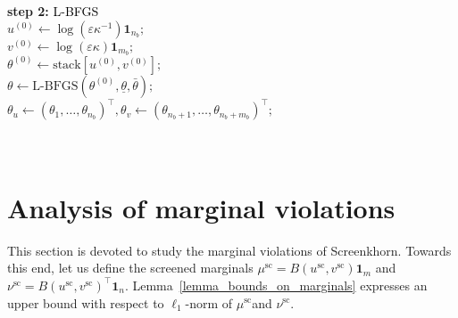 \documentclass{article}
\begin{document}
\begin{algorithm}[htbp]
\textbf{step 2:} \textcolor{black}{L-BFGS}\\

\nl  $u^{(0)} \gets \log(\varepsilon\kappa^{-1}) \mathbf 1_{n_b} ;$\\
\nl  $v^{(0)} \gets \log(\varepsilon\kappa) \mathbf 1_{m_b} ;$\\
\nl  $\theta^{(0)} \gets \text{stack}[u^{(0)}, v^{(0)}];$\\
\nl   $\theta \gets \text{L-BFGS}(\theta^{(0)}, \underline{\theta}, \bar{\theta});$\\
\nl   $\theta_u \gets (\theta_1, \ldots, \theta_{n_b})^\top, \theta_v \gets(\theta_{n_b+1}, \ldots, \theta_{n_b+m_b})^\top;$\\


\\
\\
\nl   {}
\end{algorithm}


\section{Analysis of marginal violations}
\label{sec:error_analysis}

This section is devoted to study the marginal violations of Screenkhorn. Towards this end, let us define the screened marginals $\mu^{\text{sc}} = B(u^{\text{sc}}, v^{\text{sc}}) \mathbf 1_m$ and $\nu^{\text{sc}} = B(u^{\text{sc}}, v^{\text{sc}})^\top \mathbf 1_n.$ 
Lemma~\ref{lemma_bounds_on_marginals} expresses an upper bound with respect to $\ell_1$-norm of $\mu^{\text{sc}}$and $\nu^{\text{sc}}$. %
\end{document}
